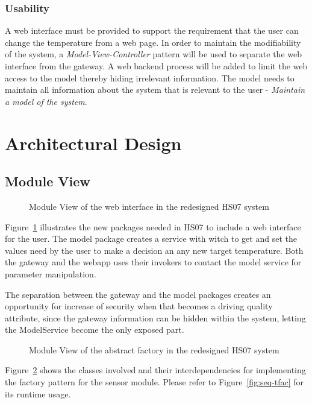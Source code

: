 \documentclass[a4paper,10pt]{article}
\begin{document}
\subsubsection{Usability}
A web interface must be provided to support the requirement that the user can change the temperature from a web page. In order to maintain the modifiability of the system, a \emph{Model-View-Controller} pattern will be used to separate the web interface from the gateway. A web backend process will be added to limit the web access to the model thereby hiding irrelevant information. The model needs to maintain all information about the system that is relevant to the user - \emph{Maintain a model of the system}.


\section{Architectural Design}

\subsection{Module View}

\begin{figure}[!htb]
\centerline{}
\caption{Module View of the web interface in the redesigned HS07 system}
\label{fig:mv-model}
\end{figure}
Figure~\ref{fig:mv-model} illustrates the new packages needed in HS07 to include a web interface for the user. The model package creates a service with witch to get and set the values  need by the user to make a decision an any new target temperature. Both the gateway and the webapp uses their invokers to contact the model service for parameter manipulation.

The separation between the gateway and the model packages creates an opportunity for increase of security when that becomes a driving quality attribute, since the gateway information can be hidden within the system, letting the ModelService become the only exposed part.
\clearpage

\begin{figure}[!htb]
\centerline{}
\caption{Module View of the abstract factory in the redesigned HS07 system}
\label{fig:mv-factory}
\end{figure}
Figure~\ref{fig:mv-factory} shows the classes involved and their interdependencies for implementing the factory pattern for the sensor module. Please refer to Figure~\ref{fig:seq-tfac} for its runtime usage.
\end{document}
